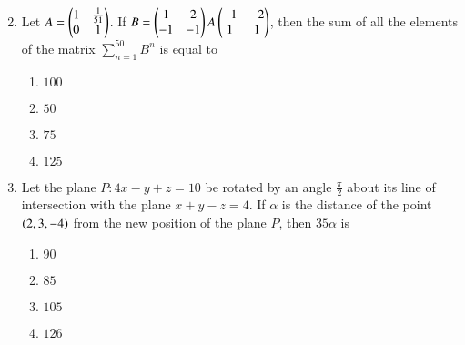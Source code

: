 \documentclass[journal,12pt,twocolumn]{IEEEtran}
\theoremstyle{remark}
\begin{document}
\begin{enumerate}
\begin{multicols}{2}
\begin{enumerate}
\end{enumerate}
\end{multicols}
\bigskip
\item Let $A=\begin{pmatrix}1&\frac{1}{51}\\0 &1\end{pmatrix}$. If $B=\begin{pmatrix}1&2\\-1&-1\end{pmatrix}A\begin{pmatrix}-1&-2\\1&1\end{pmatrix}$, then the sum of all the elements of the matrix $\sum_{n=1}^{50}B^n$ is equal to 
\begin{multicols}{2}
\begin{enumerate}
       \item $100$
       \item $50$
       \item $75$
       \item $125$
\end{enumerate}
\end{multicols}
\bigskip
\item Let the plane $P:4x-y+z=10$ be rotated by an angle $\frac{\pi}{2}$ about its line of intersection with the plane $x+y-z=4$. If $\alpha$ is the distance of the point $\left(2,3,-4\right)$ from the new position of the plane $P$, then $35\alpha$ is 
\begin{enumerate}
      \item $90$
       \item $85$
       \item $105$
       \item $126$
\end{enumerate}
\bigskip
\end{enumerate}
\end{document}
